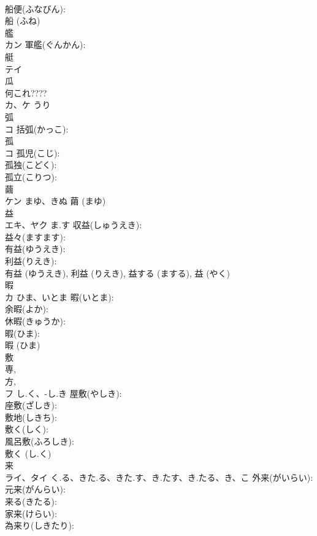 \documentclass[8pt]{extreport}
\begin{document}
\begin{CJK}{UTF8}{min}
\\	船便(ふなびん): 
\\	船 (ふね)
\\	艦			
\\	カン		軍艦(ぐんかん): 
\\	艇			
\\	テイ			
\\	瓜			
\\	何これ???? 
\\	カ、ケ	うり		
\\	弧			
\\	コ		括弧(かっこ): 
\\	孤			
\\	コ		孤児(こじ): 
\\	孤独(こどく): 
\\	孤立(こりつ): 
\\	繭			
\\	ケン	まゆ、きぬ		繭 (まゆ)
\\	益			
\\	エキ、ヤク	ま.す	収益(しゅうえき): 
\\	益々(ますます): 
\\	有益(ゆうえき): 
\\	利益(りえき): 
\\	有益 (ゆうえき), 利益 (りえき), 益する (まする), 益 (やく)
\\	暇			
\\	カ	ひま、いとま	暇(いとま): 
\\	余暇(よか): 
\\	休暇(きゅうか): 
\\	暇(ひま): 
\\	暇 (ひま)
\\	敷			
\\	専, 
\\	方, 
\\	フ	し.く、-し.き	屋敷(やしき): 
\\	座敷(ざしき): 
\\	敷地(しきち): 
\\	敷く(しく): 
\\	風呂敷(ふろしき): 
\\	敷く (し.く)
\\	来			
\\	ライ、タイ	く.る、きた.る、きた.す、き.たす、き.たる、き、こ	外来(がいらい): 
\\	元来(がんらい): 
\\	来る(きたる): 
\\	家来(けらい): 
\\	為来り(しきたり): 

\end{CJK}
\end{document}

